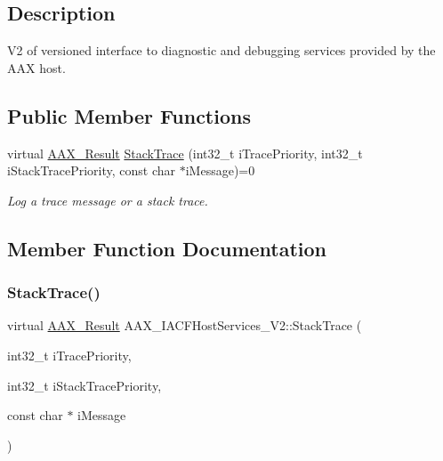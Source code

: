 \subsection{Description}
V2 of versioned interface to diagnostic and debugging services provided by the A\+AX host. \subsection*{Public Member Functions}
\begin{DoxyCompactItemize}
\item 
virtual \mbox{\hyperlink{a00392_a4d8f69a697df7f70c3a8e9b8ee130d2f}{A\+A\+X\+\_\+\+Result}} \mbox{\hyperlink{a01717_a6dd6315809e9a143e525ac7206d45573}{Stack\+Trace}} (int32\+\_\+t i\+Trace\+Priority, int32\+\_\+t i\+Stack\+Trace\+Priority, const char $\ast$i\+Message)=0
\begin{DoxyCompactList}\small\item\em Log a trace message or a stack trace. \end{DoxyCompactList}\end{DoxyCompactItemize}


\subsection{Member Function Documentation}
\mbox{\label{a01717_a6dd6315809e9a143e525ac7206d45573}} 
\subsubsection{\texorpdfstring{StackTrace()}{StackTrace()}}
{\footnotesize\ttfamily virtual \mbox{\hyperlink{a00392_a4d8f69a697df7f70c3a8e9b8ee130d2f}{A\+A\+X\+\_\+\+Result}} A\+A\+X\+\_\+\+I\+A\+C\+F\+Host\+Services\+\_\+\+V2\+::\+Stack\+Trace (\begin{DoxyParamCaption}\item[{int32\+\_\+t}]{i\+Trace\+Priority,  }\item[{int32\+\_\+t}]{i\+Stack\+Trace\+Priority,  }\item[{const char $\ast$}]{i\+Message }\end{DoxyParamCaption})\hspace{0.3cm}{\ttfamily [pure virtual]}}



